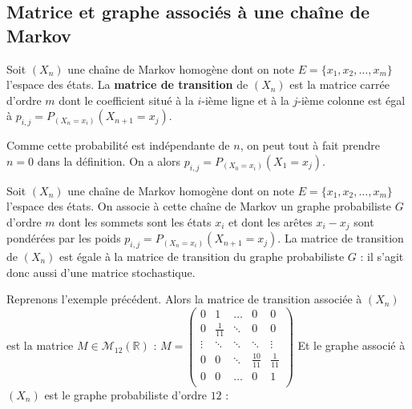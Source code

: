 	\subsection{Matrice et graphe associés à une chaîne de Markov}
	
	\begin{formula}
		Soit $(X_n)$ une chaîne de Markov homogène dont on note $E = \{x_1, x_2, \dots, x_m\}$ l'espace des états. La \textbf{matrice de transition} de $(X_n)$ est la matrice carrée d'ordre $m$ dont le coefficient situé à la $i$-ième ligne et à la $j$-ième colonne est égal à $p_{i,j} = P_{(X_n = x_i)}(X_{n+1} = x_j)$.
	\end{formula}
	
	\begin{tip}
		Comme cette probabilité est indépendante de $n$, on peut tout à fait prendre $n = 0$ dans la définition. On a alors $p_{i,j} = P_{(X_0 = x_i)}(X_1 = x_j)$.
	\end{tip}
	
	\begin{formula}
		Soit $(X_n)$ une chaîne de Markov homogène dont on note $E = \{x_1, x_2, \dots, x_m\}$ l'espace des états. On associe à cette chaîne de Markov un graphe probabiliste $G$ d'ordre $m$ dont les sommets sont les états $x_i$ et dont les arêtes $x_i - x_j$ sont pondérées par les poids $p_{i,j} = P_{(X_n = x_i)}(X_{n+1} = x_j)$.
		\newpar
		La matrice de transition de $(X_n)$ est égale à la matrice de transition du graphe probabiliste $G$ : il s'agit donc aussi d'une matrice stochastique.
	\end{formula}
	
	\begin{tip}[Exemple]
		\contentwidth[big]
		Reprenons l'exemple précédent. Alors la matrice de transition associée à $(X_n)$ est la matrice $M \in \mathcal{M}_{12}(\mathbb{R})$ :
		\newpar
		\begingroup
		\renewcommand*{\arraystretch}{1.2}
		$M = \displaystyle{\begin{pmatrix} 0 & 1 & \dots & 0 & 0 \\ 0 & \frac{1}{11} & \ddots & 0 & 0 \\
				\vdots & \ddots & \ddots & \ddots & \vdots \\ 0 & 0 & \ddots & \frac{10}{11} & \frac{1}{11} \\
				0 & 0 & \dots & 0 & 1 \\ \end{pmatrix}}$
		\endgroup
		\newpar
		Et le graphe associé à $(X_n)$ est le graphe probabiliste d'ordre $12$ :
	\end{tip}
	
